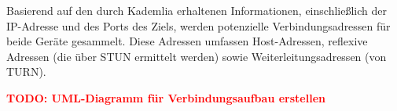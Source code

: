 Basierend auf den durch Kademlia erhaltenen Informationen, einschließlich der IP-Adresse und des Ports des Ziels, werden potenzielle Verbindungsadressen für beide Geräte gesammelt. Diese Adressen umfassen Host-Adressen, reflexive Adressen (die über STUN ermittelt werden) sowie Weiterleitungsadressen (von TURN).




\textbf{\textcolor{red}{TODO: UML-Diagramm für Verbindungsaufbau erstellen}}








